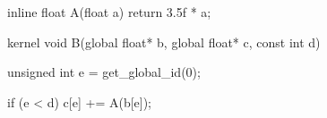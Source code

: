 inline float A(float a) {
  return 3.5f * a;
}

kernel void B(global float* b, global float* c, const int d) {
  unsigned int e = get_global_id(0);

  if (e < d) {
    c[e] += A(b[e]);
  }
}
